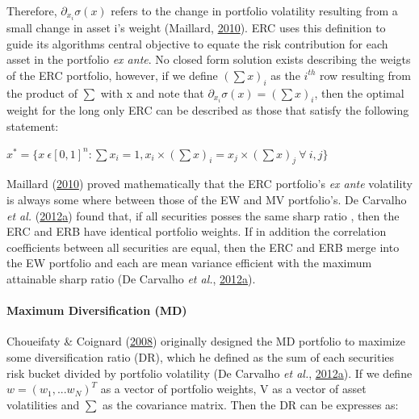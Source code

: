 \documentclass[11pt,preprint, authoryear]{elsarticle}
\numberwithin{equation}{section}
\numberwithin{figure}{section}
\numberwithin{table}{section}
\begin{document}
Therefore, \(\partial_{x_i}\sigma(x)\) refers to the change in portfolio
volatility resulting from a small change in asset i's weight (Maillard,
\protect\hyperlink{ref-maillard2010}{2010}). ERC uses this definition to
guide its algorithms central objective to equate the risk contribution
for each asset in the portfolio \emph{ex ante}. No closed form solution
exists describing the weigts of the ERC portfolio, however, if we define
\((\sum x)_i\) as the \(i^{th}\) row resulting from the product of
\(\sum\) with x and note that \(\partial_{x_i}\sigma(x)=(\sum x)_i\),
then the optimal weight for the long only ERC can be described as those
that satisfy the following statement:

\begin{center}
$x^*=\{x \ \epsilon[0,1]^n:\sum x_i=1, x_i \times (\sum x)_i=x_j \times (\sum x)_j \ \forall  \ i,j \}$ 
\end{center}

Maillard (\protect\hyperlink{ref-maillard2010}{2010}) proved
mathematically that the ERC portfolio's \emph{ex ante} volatility is
always some where between those of the EW and MV portfolio's. De
Carvalho \emph{et al.}
(\protect\hyperlink{ref-leote}{2012}\protect\hyperlink{ref-leote}{a})
found that, if all securities posses the same sharp ratio , then the ERC
and ERB have identical portfolio weights. If in addition the correlation
coefficients between all securities are equal, then the ERC and ERB
merge into the EW portfolio and each are mean variance efficient with
the maximum attainable sharp ratio (De Carvalho \emph{et al.},
\protect\hyperlink{ref-leote}{2012}\protect\hyperlink{ref-leote}{a}).

\hypertarget{maximum-diversification-md}{%
\paragraph{Maximum Diversification
(MD)}\label{maximum-diversification-md}}

Choueifaty \& Coignard (\protect\hyperlink{ref-choueifaty2008}{2008})
originally designed the MD portfolio to maximize some diversification
ratio (DR), which he defined as the sum of each securities risk bucket
divided by portfolio volatility (De Carvalho \emph{et al.},
\protect\hyperlink{ref-leote}{2012}\protect\hyperlink{ref-leote}{a}). If
we define \(w=(w_1,...w_N)^T\) as a vector of portfolio weights, V as a
vector of asset volatilities and \(\sum\) as the covariance matrix. Then
the DR can be expresses as:
\end{document}
